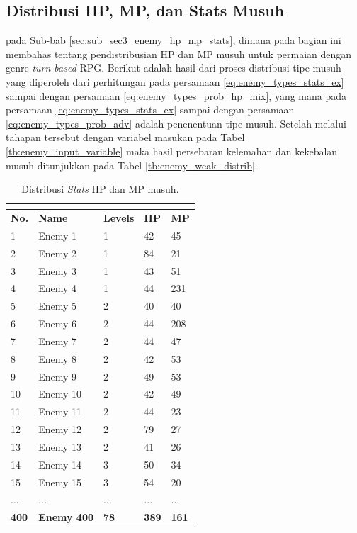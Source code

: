 \subsection{Distribusi HP, MP, dan Stats Musuh}
\label{sec:sub_sec4_eval_dist_enemy_HP_MP_Stats}
\vspace{1ex}

pada Sub-bab \ref{sec:sub_sec3_enemy_hp_mp_stats}, dimana pada bagian ini membahas tentang pendistribusian HP dan MP musuh untuk permaian dengan genre \textit{turn-based} RPG. Berikut adalah hasil dari proses distribusi tipe musuh yang diperoleh dari perhitungan pada persamaan \ref{eq:enemy_types_stats_ex} sampai dengan persamaan \ref{eq:enemy_types_prob_hp_mix}, yang mana pada persamaan \ref{eq:enemy_types_stats_ex} sampai dengan persamaan \ref{eq:enemy_types_prob_adv} adalah penenentuan tipe musuh. Setelah melalui tahapan tersebut dengan variabel masukan pada Tabel \ref{tb:enemy_input_variable} maka hasil persebaran kelemahan dan kekebalan musuh ditunjukkan pada Tabel \ref{tb:enemy_weak_distrib}.
\vspace{-1ex}

\begin{longtable}{|l|l|l|l|l|}
	\caption{Distribusi \textit{Stats} HP dan MP musuh.}
	\vspace{1ex}
	\label{tb:enemy_weak_stats}\\
	\hline
	\rowcolor[HTML]{C0C0C0} 
	\textbf{No.} & \textbf{Name} & \textbf{Levels} & \textbf{HP} & \textbf{MP} \\ \hline
	1 & Enemy 1 & 1 & 42 & 45 \\ \hline
	2 & Enemy 2 & 1 & 84 & 21 \\ \hline
	3 & Enemy 3 & 1 & 43 & 51 \\ \hline
	4 & Enemy 4 & 1 & 44 & 231 \\ \hline
	5 & Enemy 5 & 2 & 40 & 40 \\ \hline
	6 & Enemy 6 & 2 & 44 & 208 \\ \hline
	7 & Enemy 7 & 2 & 44 & 47 \\ \hline
	8 & Enemy 8 & 2 & 42 & 53 \\ \hline
	9 & Enemy 9 & 2 & 49 & 53 \\ \hline
	10 & Enemy 10 & 2 & 42 & 49 \\ \hline
	11 & Enemy 11 & 2 & 44 & 23 \\ \hline
	12 & Enemy 12 & 2 & 79 & 27 \\ \hline
	13 & Enemy 13 & 2 & 41 & 26 \\ \hline
	14 & Enemy 14 & 3 & 50 & 34 \\ \hline
	15 & Enemy 15 & 3 & 54 & 20 \\ \hline
	... & ... & ... & ... & ... \\ \hline
	\textbf{400} & \textbf{Enemy 400} & \textbf{78} & \textbf{389} & \textbf{161} \\ \hline
\end{longtable}
\vspace{1ex}

